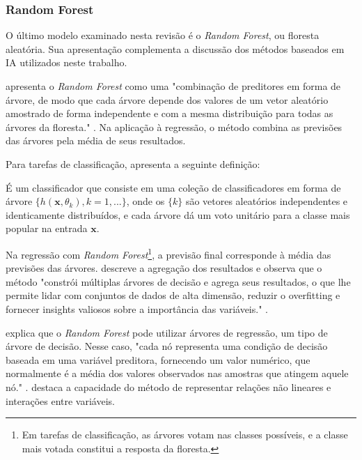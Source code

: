  

\subsubsection{Random Forest}

O último modelo examinado nesta revisão é o \textit{Random Forest}, ou floresta aleatória. Sua apresentação complementa a discussão dos métodos baseados em IA utilizados neste trabalho.

 apresenta o \textit{Random Forest} como uma "combinação de preditores em forma de árvore, de modo que cada árvore depende dos valores de um vetor aleatório amostrado de forma independente e com a mesma distribuição para todas as árvores da floresta." . Na aplicação à regressão, o método combina as previsões das árvores pela média de seus resultados.

Para tarefas de classificação,  apresenta a seguinte definição:

\begin{citacao}
	É um classificador que consiste em uma coleção de classificadores em forma de árvore $\{h(\mathbf{x}, \theta_k), k=1, ... \}$, onde os $\{k\}$ são vetores aleatórios independentes e identicamente distribuídos, e cada árvore dá um voto unitário para a classe mais popular na entrada $\mathbf{x}$. 
\end{citacao}

Na regressão com \textit{Random Forest}\footnote{Em tarefas de classificação, as árvores votam nas classes possíveis, e a classe mais votada constitui a resposta da floresta.}, a previsão final corresponde à média das previsões das árvores.  descreve a agregação dos resultados e observa que o método "constrói múltiplas árvores de decisão e agrega seus resultados, o que lhe permite lidar com conjuntos de dados de alta dimensão, reduzir o overfitting e fornecer insights valiosos sobre a importância das variáveis." .

 explica que o \textit{Random Forest} pode utilizar árvores de regressão, um tipo de árvore de decisão. Nesse caso, "cada nó representa uma condição de decisão baseada em uma variável preditora, fornecendo um valor numérico, que normalmente é a média dos valores observados nas amostras que atingem aquele nó." .  destaca a capacidade do método de representar relações não lineares e interações entre variáveis.


